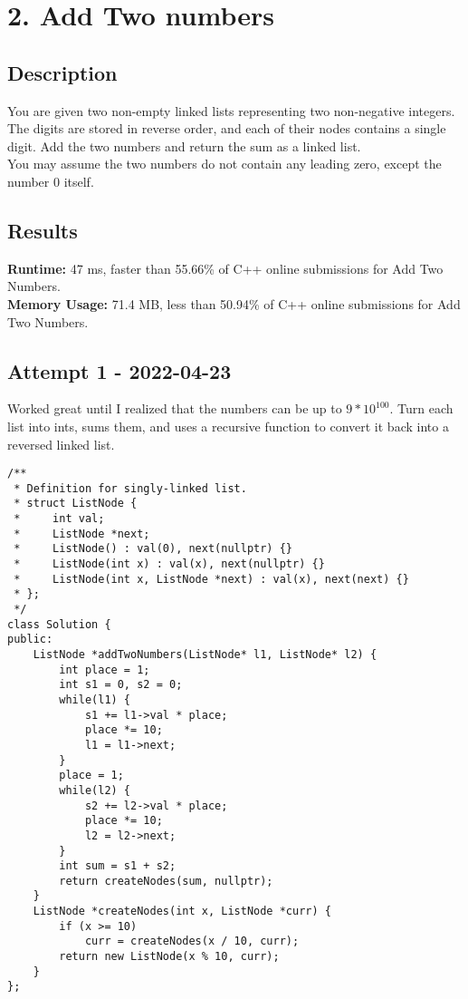 \chapter{2. Add Two numbers}
\section{Description}
You are given two non-empty linked lists representing two non-negative integers. The digits are stored in reverse order, and each of their nodes contains a single digit. Add the two numbers and return the sum as a linked list.
\\
You may assume the two numbers do not contain any leading zero, except the number 0 itself.\\
\section{Results}
\textbf{Runtime:} 47 ms, faster than 55.66\% of C++ online submissions for Add Two Numbers.\\
\textbf{Memory Usage:} 71.4 MB, less than 50.94\% of C++ online submissions for Add Two Numbers.\\
\newpage
\section{Attempt 1 - 2022-04-23} Worked great until I realized that the numbers can be up to $9*10^{100}$. Turn each list into
ints, sums them, and uses a recursive function to convert it back into a reversed linked list.\\
\begin{lstlisting}
/**
 * Definition for singly-linked list.
 * struct ListNode {
 *     int val;
 *     ListNode *next;
 *     ListNode() : val(0), next(nullptr) {}
 *     ListNode(int x) : val(x), next(nullptr) {}
 *     ListNode(int x, ListNode *next) : val(x), next(next) {}
 * };
 */
class Solution {
public:
    ListNode *addTwoNumbers(ListNode* l1, ListNode* l2) {
        int place = 1;
        int s1 = 0, s2 = 0;
        while(l1) {
            s1 += l1->val * place;
            place *= 10;
            l1 = l1->next;
        }
        place = 1;
        while(l2) {
            s2 += l2->val * place;
            place *= 10;
            l2 = l2->next;
        }
        int sum = s1 + s2;
        return createNodes(sum, nullptr);
    }
    ListNode *createNodes(int x, ListNode *curr) {
        if (x >= 10) 
            curr = createNodes(x / 10, curr);
        return new ListNode(x % 10, curr);
    }
};
\end{lstlisting}
\newpage
